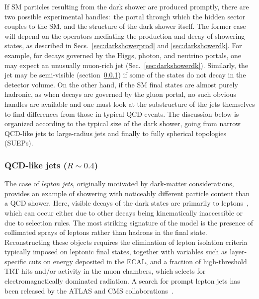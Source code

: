 \begin{enumerate}
If SM particles resulting from the dark shower are produced promptly, there are two possible experimental handles:~the portal through which the hidden sector couples to the SM, and the structure of the dark shower itself.
The former case will depend on the
operators mediating the production and decay of showering states, as described in Secs.~\ref{sec:darkshowerprod} and \ref{sec:darkshowerdk}.
For example, for decays governed by the Higgs, photon, and neutrino portals, one may expect an unusually muon-rich jet (Sec.~\ref{sec:darkshowerdk}). Similarly, the jet may be semi-visible (section~\ref{sec:darkshowerthinjet}) if some of the states do not decay in the detector volume. On the other hand, if the SM final states are almost purely hadronic, as when decays are governed by the gluon portal, no such obvious handles are available and one must look at the substructure of the jets themselves to find differences from those in typical QCD events. The discussion below is organized according to the typical size of the dark shower, going from narrow QCD-like jets to large-radius jets and finally to fully spherical topologies (SUEPs).



%
\subsubsection{QCD-like jets ($R \sim 0.4$)} %
\label{sec:darkshowerthinjet}

The case of \emph{lepton jets}, originally motivated by dark-matter considerations, provides an example of showering with noticeably different particle content than a QCD shower. Here, visible decays of the dark states are primarily to leptons~\cite{Falkowski:2010cm,Falkowski:2010gv}, which can occur either due to other decays being kinematically inaccessible or due to selection rules. The most striking signature of the model is the presence of collimated sprays of leptons rather than hadrons in the final state. Reconstructing these objects requires the elimination of lepton isolation criteria typically imposed on leptonic final states, together with variables such as layer-specific cuts on energy deposited in the ECAL, and a fraction of high-threshold TRT hits and/or activity in the muon chambers, which selects for electromagnetically dominated radiation. A search for prompt lepton jets has been released by the ATLAS and CMS collaborations~\cite{Chatrchyan:2011hr,Aad:2015sms}.


\end{enumerate}
